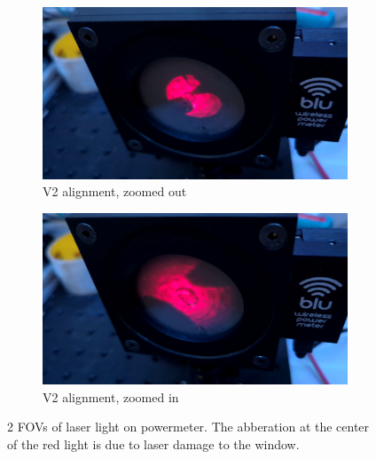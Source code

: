             \begin{figure}[!ht]
                \centering
                \begin{subfigure}[t]{0.45\textwidth}
                    \centering
                    \includegraphics[width=\textwidth]{assets/4 experiments/V2 alignment 1.png}
                    \caption{V2 alignment, zoomed out}
                \end{subfigure}
                \hfill
                \begin{subfigure}[t]{0.45\textwidth}
                    \centering
                    \includegraphics[width=\textwidth]{assets/4 experiments/V2 alignment 2.png}
                    \caption{V2 alignment, zoomed in}
                \end{subfigure}
                \caption{2 FOVs of laser light on powermeter. The abberation at the center of the red light is due to laser damage to the window.}
                \label{fig:FOV}
            \end{figure}




